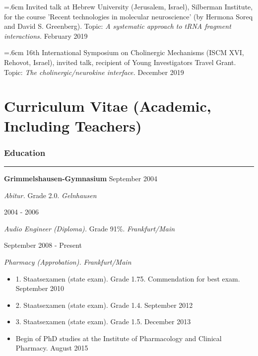 \noindent \hangindent=.6cm Invited talk at Hebrew University (Jerusalem, Israel), Silberman Institute, for the course 'Recent technologies in molecular neuroscience' (by Hermona Soreq and David S. Greenberg). Topic: \emph{A systematic approach to tRNA fragment interactions.} February 2019

\noindent \hangindent=.6cm 16th International Symposium on Cholinergic Mechanisms (ISCM XVI, Rehovot, Israel), invited talk, recipient of Young Investigators Travel Grant. Topic: \emph{The cholinergic/neurokine interface.} December 2019

\newpage

\section{Curriculum Vitae (Academic, Including Teachers)}
\small

\subsubsection{\textbf{Education}}
\vspace{-8pt}
\hrule
\vspace{10pt}

{\bf Grimmelshausen-Gymnasium} \hfill September 2004

\emph{Abitur.} Grade 2.0. \hfill \emph{Gelnhausen} \medskip

 \hfill 2004 - 2006

\emph{Audio Engineer (Diploma).} Grade 91\%. \hfill \emph{Frankfurt/Main} \medskip

 \hfill September 2008 - Present

\emph{Pharmacy (Approbation).} \hfill \emph{Frankfurt/Main}
\vspace{-10pt}
\begin{itemize}[noitemsep, leftmargin=.5cm, label={\tiny\raisebox{.5ex}{\textbullet}}]
\item 1. Staatsexamen (state exam). Grade 1.75. Commendation for best exam. \hfill September 2010
\item 2. Staatsexamen (state exam). Grade 1.4. \hfill September 2012
\item 3. Staatsexamen (state exam). Grade 1.5. \hfill December 2013
\item Begin of PhD studies at the Institute of Pharmacology and Clinical Pharmacy. \hfill August 2015
\end{itemize}

